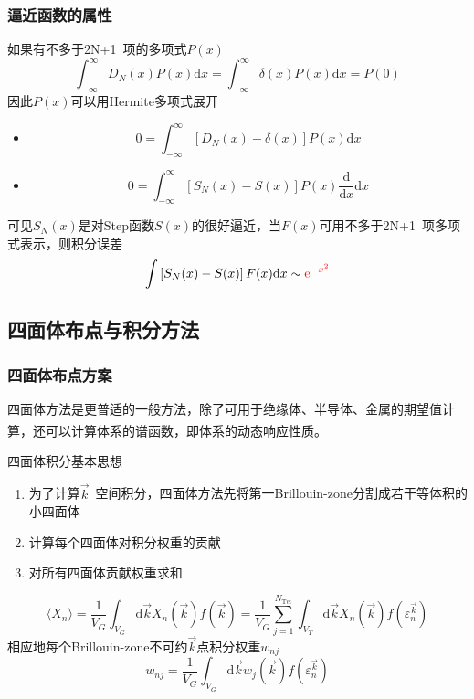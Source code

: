 \documentclass[cjk,slidestop,compress,mathserif,blue]{beamer}
\newcommand{\upcite}[1]{\hspace{0ex}\textsuperscript{\cite{#1}}} %
\begin{document}
\frame
{
	\frametitle{逼近函数的属性}
	如果有不多于\textrm{2N+1~}项的多项式$P(x)$
	\begin{displaymath}
		\int_{-\infty}^{\infty}D_N(x)P(x)\mathrm{d}x=\int_{-\infty}^{\infty}\delta(x)P(x)\mathrm{d}x=P(0)
	\end{displaymath}
	因此$P(x)$可以用\textrm{Hermite}多项式展开
\begin{itemize}
	\item \begin{displaymath}
			0=\int_{-\infty}^{\infty}\left[D_N(x)-\delta(x)\right]P(x)\mathrm{d}x
	\end{displaymath}
	\item \begin{displaymath}
			0=\int_{-\infty}^{\infty}\left[S_N(x)-S(x)\right]P(x)\frac{{\mathrm d}}{\mathrm dx}\mathrm{d}x
	\end{displaymath}
\end{itemize}
可见$S_N(x)$是对\textrm{Step}函数$S(x)$的很好逼近，当$F(x)$可用不多于\textrm{2N+1~}项多项式表示，则积分误差
$$\int\left[S_N(x)-S(x)\right]F(x)\mathrm{d}x\sim\textcolor{red}{\mathrm{e}^{-x^2}}$$
}

\subsection{四面体布点与积分方法}
\frame
{
	\frametitle{四面体布点方案}
	四面体方法是更普适的一般方法，除了可用于绝缘体、半导体、金属的期望值计算，还可以计算体系的谱函数，即体系的动态响应性质。\upcite{PRB49-16223_1994}

	四面体积分基本思想
	\begin{enumerate}
		\item 为了计算$\vec k$~空间积分，四面体方法先将第一\textrm{Brillouin-zone}分割成若干等体积的小四面体
		\item 计算每个四面体对积分权重的贡献
		\item 对所有四面体贡献权重求和
	\end{enumerate}
	\begin{displaymath}
		\langle X_n\rangle=\dfrac1{V_G}\int_{V_G}\mathrm{d}\vec kX_n(\vec k)f(\vec k)=\dfrac1{V_G}\sum_{j=1}^{N_{\mathrm{Tet}}}\int_{V_T}\mathrm{d}\vec kX_n(\vec k)f(\varepsilon_n^{\vec k})
	\end{displaymath}
	相应地每个\textrm{Brillouin-zone}不可约$\vec k$点积分权重$w_{nj}$
	\begin{displaymath}
		w_{nj}=\dfrac1{V_G}\int_{V_G}\mathrm{d}\vec kw_j(\vec k)f(\varepsilon_n^{\vec k})
	\end{displaymath}
}
\end{document}
